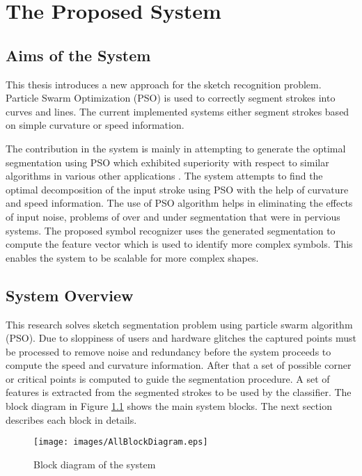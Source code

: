 \chapter{The Proposed System}
\label{sec:proposedSystem}
\section{Aims of the System}
\label{sec:AimsOfTheSystem}
This thesis introduces a new approach for the sketch recognition problem. Particle Swarm Optimization (PSO) is used to correctly segment strokes into curves and lines. The current implemented systems either segment strokes based on simple curvature\cite{meanshift10,earlySketchbased4} or speed information\cite{earlySketchbased4}.


The contribution in the system is mainly in attempting to generate the optimal segmentation using PSO which exhibited superiority with respect to similar algorithms in various other applications \cite{PolygonApproximationPSO}. The system attempts to find the optimal decomposition of the input stroke using PSO with the help of curvature and speed information. The use of PSO algorithm helps in eliminating the effects of input noise, problems of over and under segmentation that were in pervious systems. The proposed symbol recognizer uses the generated segmentation to compute the feature vector which is used to identify more complex symbols. This enables the system to be scalable for more complex shapes.


\section{System Overview}
\label{sec:AnOverviewOfTheSystem}
   This research solves sketch segmentation problem using particle swarm algorithm (PSO).  Due to sloppiness of users and hardware glitches the captured points must be processed to remove noise and redundancy before the system proceeds to compute the speed and curvature information. After that a set of possible corner or critical points is computed to guide the segmentation procedure.  A set of features is extracted from the segmented strokes to be used by the classifier.  %
The block diagram in Figure \ref{fig:Blockdiagram} shows the main system blocks. The next section describes each block in details.
\begin{figure}[]
	\centering
	
\begin{center}
	\texttt{[image: images/AllBlockDiagram.eps]}
	\caption[The System Block Diagram]{Block diagram of the system}
	\label{fig:Blockdiagram}
\end{center}
\end{figure}
 


